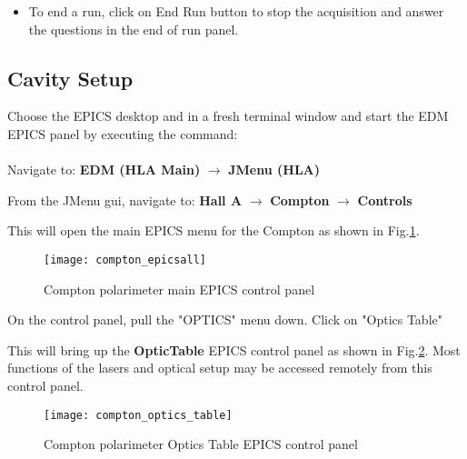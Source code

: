 {\begin{itemize}
{\it transition Go succeeded}\\
the counting rates distribution\\
the number of events in this run is updating\\
the run status {\it active}\\
the run number updated\\

\item To end a run, click on End Run button to stop the acquisition and answer the questions in the end of run panel.
\end{itemize}



\subsection{Cavity Setup}
Choose the EPICS desktop and in a fresh terminal window and start the EDM~\cite{MEDMwww} EPICS panel 
 by executing  the command:\\

\\

Navigate to:  {\bf EDM (HLA Main)}  $\rightarrow$  {\bf JMenu (HLA)}

From the JMenu gui, navigate to: {\bf Hall A}  $\rightarrow$  {\bf Compton} $\rightarrow$  {\bf Controls}


This will open the main EPICS menu for the Compton as shown in Fig.\ref{fig:compton_epicsall}.
 \begin{figure}[htp]
    \begin{center}
        \texttt{[image: compton\_epicsall]}
    \end{center}
    \caption[compton:epics main control]{Compton polarimeter main EPICS control panel}
    \label{fig:compton_epicsall}
 \end{figure}

On the control panel, pull the "OPTICS" menu down. Click on "Optics Table" 

	This will bring up the {\bf OpticTable} EPICS control panel as shown in Fig.\ref{fig:compton_table}. Most functions of the lasers and optical setup may be accessed remotely from this  control panel. 


 \begin{figure}[htp]
    \begin{center}
        \texttt{[image: compton\_optics\_table]}
    \end{center}
    \caption[compton:epics main control]{Compton polarimeter Optics Table  EPICS control panel}
    \label{fig:compton_table}
 \end{figure}

}
